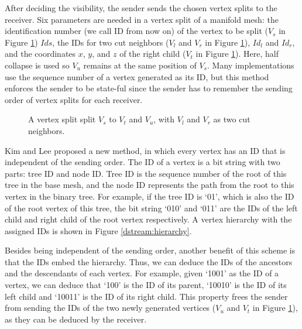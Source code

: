     After deciding the visibility, the sender sends the chosen vertex splits to the receiver.
    Six parameters are needed in a vertex split of a manifold mesh: the identification number
    (we call ID from now on) of the vertex to be split
    ($V_s$ in Figure \ref{dstream:split}) $Ids$, 
    the IDs for two cut neighbors 
    ($V_l$ and $V_r$ in Figure \ref{dstream:split}), $Id_l$ and $Id_r$,
    and the coordinates $x$, $y$, and $z$ of the right child ($V_t$ in
    Figure \ref{dstream:split}). Here, half collapse is used so $V_u$ remains at the same position
    of $V_s$. Many implementations use the sequence number of a vertex generated as its ID,
    but this method enforces the sender to be state-ful since the sender has to remember 
    the sending order of vertex splits for each receiver. 
    \begin{figure}
    \centering
    \caption{A vertex split split $V_s$ to $V_t$ and $V_u$, with $V_l$ and $V_r$ as two cut neighbors.}
    \label{dstream:split}
    \end{figure}

    Kim and Lee \cite{kim01truly} proposed a new method, in which every vertex has
    an ID that is independent of the sending order. The ID of a vertex is a bit string
    with two parts: tree ID and node ID.
    Tree ID is the sequence number of the root of this tree in the base mesh, 
    and the node ID represents the path from the root to this vertex in the binary tree.
    For example, if the tree ID is `01', which is also the ID of
    the root vertex of this tree, the bit string `010' and `011' are the IDs
    of the left child and right child of the root vertex respectively. 
    A vertex hierarchy with the assigned IDs is shown in 
    Figure \ref{dstream:hierarchy}.
    
    Besides being independent of the sending order, another benefit of this scheme
    is that the IDs embed the hierarchy. Thus,  
    we can deduce the IDs of the ancestors and the descendants of each vertex. 
    For example, given `1001' as the ID of a vertex,
    we can deduce that `100' is the ID of its parent, `10010' is the ID of its left child and 
    `10011' is the ID of its right child. 
    This property frees the sender from sending the IDs of the two newly generated vertices
    ($V_u$ and $V_t$ in Figure \ref{dstream:split}), as they can be deduced by the receiver.
    
